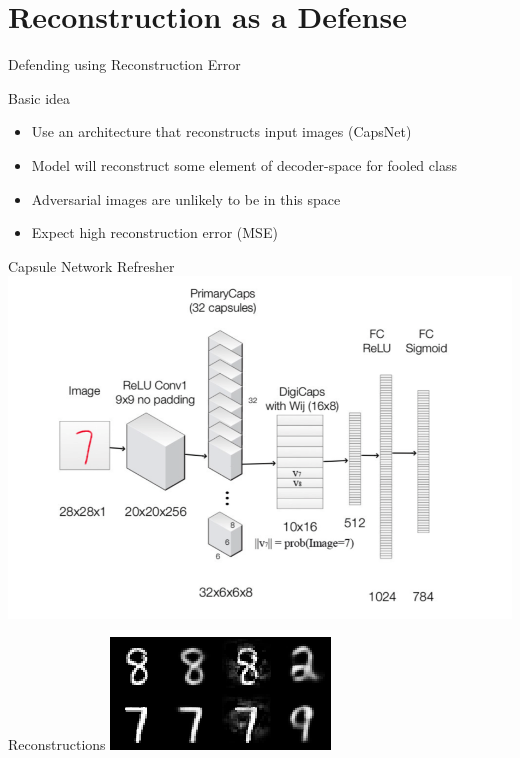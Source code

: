 \documentclass{beamer}
\begin{document}
	\section*{Reconstruction as a Defense}
	
	\begin{frame}{Defending using Reconstruction Error}
		\begin{block}{Basic idea}
			\begin{itemize}
				\item Use an architecture that reconstructs input images (CapsNet)
				\item Model will reconstruct some element of decoder-space for fooled class
				\item Adversarial images are unlikely to be in this space
				\item Expect high reconstruction error (MSE)
			\end{itemize}
		\end{block}
	\end{frame}
	
	\begin{frame}{Capsule Network Refresher}
		\centering
		\includegraphics[width=\textwidth]{caps_recon}
	\end{frame}
	
	\begin{frame}{Reconstructions}
		\centering
		\includegraphics[width=\textwidth]{recon-fig5}
	\end{frame}
	
\end{document}
